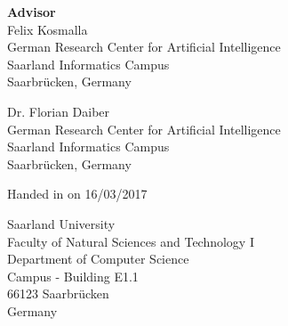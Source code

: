 \pagestyle{empty}

\vspace*{0.5cm}
\textbf{Advisor}\\
Felix Kosmalla\\
German Research Center for Artificial Intelligence\\
Saarland Informatics Campus\\
Saarbrücken, Germany

\vspace*{0.5cm}
Dr. Florian Daiber\\
German Research Center for Artificial Intelligence\\
Saarland Informatics Campus\\
Saarbrücken, Germany


\vspace{3.5cm}
Handed in on 16/03/2017


\vspace{3.5cm}


\vspace{3cm}
Saarland University\\
Faculty of Natural Sciences and Technology I\\
Department of Computer Science\\
Campus - Building E1.1\\
66123 Saarbrücken\\
Germany\\


